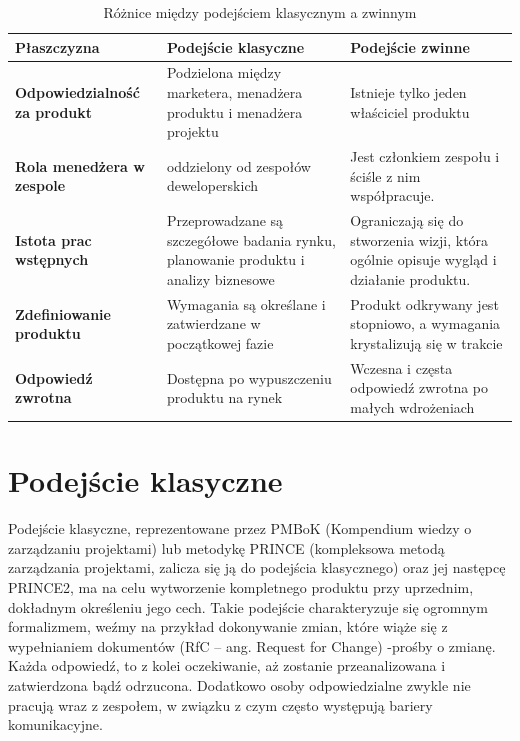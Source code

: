 \begin{table}
\centering\caption{ Różnice między podejściem klasycznym a zwinnym\label{tabela:roznice}}
\begin{tabular}{ p{} p{}  p{} }%
\toprule
\textbf{Płaszczyzna} &\textbf{ Podejście klasyczne} & \textbf{Podejście zwinne} \\
\midrule
\textbf{Odpowiedzialność
za produkt}
 & Podzielona między marketera,
 menadżera produktu i menadżera projektu & Istnieje tylko jeden właściciel produktu \\
\midrule
\textbf{Rola menedżera
w zespole} & oddzielony od zespołów deweloperskich & Jest członkiem zespołu i ściśle z nim współpracuje.\\
\midrule
\textbf{Istota prac wstępnych} & Przeprowadzane są szczegółowe badania rynku, planowanie produktu i analizy biznesowe
& Ograniczają się do stworzenia wizji, która ogólnie opisuje wygląd i działanie produktu. \\
\midrule
\textbf{Zdefiniowanie
produktu} & Wymagania są określane i zatwierdzane w początkowej fazie
& Produkt odkrywany jest stopniowo, a wymagania krystalizują się w trakcie
\\
\midrule
\textbf{Odpowiedź zwrotna} & Dostępna po wypuszczeniu produktu na rynek
& Wczesna i częsta odpowiedź zwrotna po małych wdrożeniach
\\
\bottomrule
\end{tabular}
\end{table}
\newpage

\section{Podejście klasyczne}

Podejście klasyczne, reprezentowane przez PMBoK (Kompendium wiedzy o zarządzaniu projektami) lub metodykę PRINCE
(kompleksowa metodą zarządzania projektami, zalicza się ją do podejścia klasycznego) oraz jej następcę PRINCE2,
ma na celu wytworzenie kompletnego produktu przy uprzednim, dokładnym określeniu jego cech.
Takie podejście charakteryzuje się ogromnym formalizmem, weźmy na przykład dokonywanie zmian,
które wiąże się z wypełnianiem dokumentów (RfC – ang. Request for Change) -prośby o zmianę.
Każda odpowiedź, to z kolei oczekiwanie, aż zostanie przeanalizowana i zatwierdzona bądź odrzucona.
Dodatkowo osoby odpowiedzialne zwykle nie pracują wraz z zespołem, w związku z czym często występują bariery komunikacyjne.\cite{www_tradycyjne_projekty}

